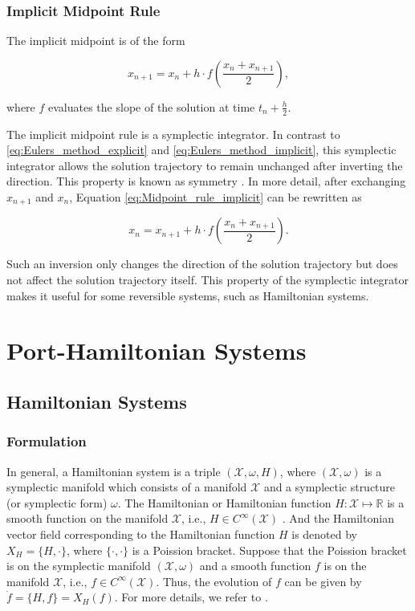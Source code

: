 \documentclass[
	parskip, 			   %
	twoside, 			   %
	DIV=14, 			   %
	BCOR=15.0mm, 		   %
	headsepline, 		   %
	open=right, 		   %
	captions=tableheading, %
	bibliography=totoc,    %
	numbers=noenddot       %
]{scrreprt}
\begin{document}
\subsection{Implicit Midpoint Rule}
The implicit midpoint is of the form

\begin{equation}
    \label{eq:Midpoint_rule_implicit}
    x_{n+1} = x_{n} + h \cdot f\left(\frac{x_{n} + x_{n+1}}{2}\right),
\end{equation}

where $f$ evaluates the slope of the solution at time $t_{n}+\frac{h}{2}$.

The implicit midpoint rule is a symplectic integrator. In contrast to \ref{eq:Eulers_method_explicit} and \ref{eq:Eulers_method_implicit}, this symplectic integrator allows the solution trajectory to remain unchanged after inverting the direction. This property is known as symmetry \cite{hairer2006geometric}. In more detail, after exchanging $x_{n+1}$ and $x_{n}$, Equation \ref{eq:Midpoint_rule_implicit} can be rewritten as

\begin{equation}
    \label{eq:Midpoint_rule_implicit_inverted}
    x_{n} = x_{n+1} + h \cdot f\left(\frac{x_{n} + x_{n+1}}{2}\right).
\end{equation}

Such an inversion only changes the direction of the solution trajectory but does not affect the solution trajectory itself. This property of the symplectic integrator makes it useful for some reversible systems, such as Hamiltonian systems.

\clearpage
\chapter{Port-Hamiltonian Systems}
\label{ch:chapter3}

\section{Hamiltonian Systems}

\subsection{Formulation}
In general, a Hamiltonian system is a triple $(\mathcal{X},\omega,H)$, where $(\mathcal{X},\omega)$ is a symplectic manifold which consists of a manifold $\mathcal{X}$ and a symplectic structure (or symplectic form) $\omega$. The Hamiltonian or Hamiltonian function $H: \mathcal{X} \mapsto \mathbb{R} $ is a smooth function on the manifold $\mathcal{X}$, i.e., $H \in C^{\infty}(\mathcal{X})$ \cite{rudolph2017differential}. And the Hamiltonian vector field corresponding to the Hamiltonian function $H$ is denoted by $X_H = \{H, \cdot \}$, where $\{\cdot, \cdot\}$ is a Poission bracket. Suppose that the Poission bracket is on the symplectic manifold $(\mathcal{X},\omega)$ and a smooth function $f$ is on the manifold $\mathcal{X}$, i.e., $f \in C^{\infty}(\mathcal{X}) $. Thus, the evolution of $f$ can be given by $\dot{f} = \{H, f\} = X_H(f)$. For more details, we refer to \cite{rudolph2012differential}.
\end{document}
